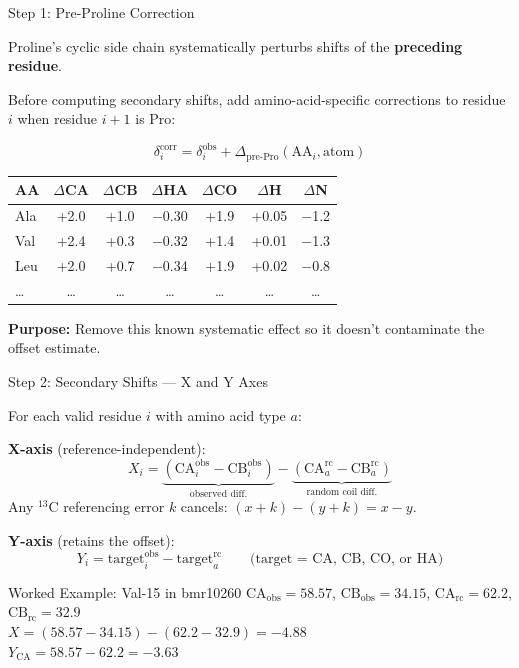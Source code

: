 \documentclass[aspectratio=169,11pt]{beamer}
\begin{document}
\begin{frame}[shrink=8]{Step 1: Pre-Proline Correction}

Proline's cyclic side chain systematically perturbs shifts of the \textbf{preceding residue}.

\medskip
Before computing secondary shifts, add amino-acid-specific corrections to residue $i$ when residue $i{+}1$ is Pro:

\[
\delta^{\text{corr}}_{i} = \delta^{\text{obs}}_{i} + \Delta_{\text{pre-Pro}}(\text{AA}_i, \text{atom})
\]

\medskip
\begin{center}
\footnotesize
\begin{tabular}{lcccccc}
\toprule
AA & $\Delta$CA & $\Delta$CB & $\Delta$HA & $\Delta$CO & $\Delta$H & $\Delta$N \\
\midrule
Ala & +2.0 & +1.0 & $-$0.30 & +1.9 & +0.05 & $-$1.2 \\
Val & +2.4 & +0.3 & $-$0.32 & +1.4 & +0.01 & $-$1.3 \\
Leu & +2.0 & +0.7 & $-$0.34 & +1.9 & +0.02 & $-$0.8 \\
\ldots & \ldots & \ldots & \ldots & \ldots & \ldots & \ldots \\
\bottomrule
\end{tabular}
\end{center}

\medskip
\textbf{Purpose:} Remove this known systematic effect so it doesn't contaminate the offset estimate.
\end{frame}

\begin{frame}{Step 2: Secondary Shifts --- X and Y Axes}

For each valid residue $i$ with amino acid type $a$:

\smallskip
\textbf{X-axis} (reference-independent):
\[
  X_i = \underbrace{(\text{CA}^{\text{obs}}_i - \text{CB}^{\text{obs}}_i)}_{\text{observed diff.}}
      - \underbrace{(\text{CA}^{\text{rc}}_a - \text{CB}^{\text{rc}}_a)}_{\text{random coil diff.}}
\]
Any ${}^{13}$C referencing error $k$ cancels: $(x{+}k){-}(y{+}k) = x{-}y$.

\smallskip
\textbf{Y-axis} (retains the offset):
\[
  Y_i = \text{target}^{\text{obs}}_i - \text{target}^{\text{rc}}_a
  \qquad \text{(target = CA, CB, CO, or HA)}
\]

\begin{exampleblock}{Worked Example: Val-15 in bmr10260}
\small
$\text{CA}_\text{obs} = 58.57$,\; $\text{CB}_\text{obs} = 34.15$,\;
$\text{CA}_\text{rc} = 62.2$,\; $\text{CB}_\text{rc} = 32.9$ \\[2pt]
$X = (58.57 - 34.15) - (62.2 - 32.9) = -4.88$ \\[1pt]
$Y_\text{CA} = 58.57 - 62.2 = -3.63$
\end{exampleblock}
\end{frame}
\end{document}
